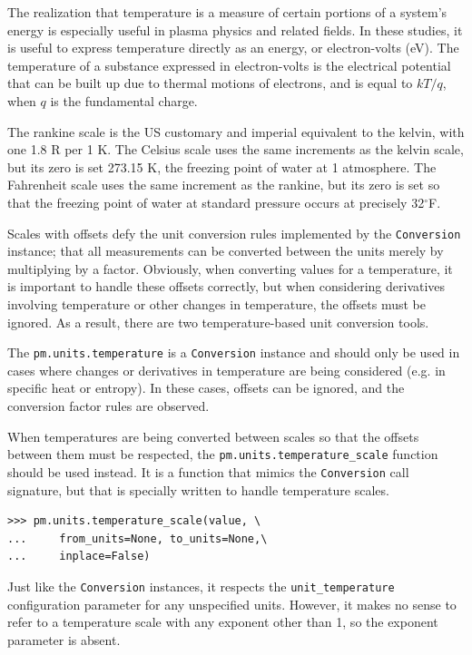 The realization that temperature is a measure of certain portions of a system's energy is especially useful in plasma physics and related fields.  In these studies, it is useful to express temperature directly as an energy, or electron-volts (eV).  The temperature of a substance expressed in electron-volts is the electrical potential that can be built up due to thermal motions of electrons, and is equal to $kT / q$, when $q$ is the fundamental charge.

The rankine scale is the US customary and imperial equivalent to the kelvin, with one 1.8 R per 1 K.  The Celsius scale uses the same increments as the kelvin scale, but its zero is set 273.15 K, the freezing point of water at 1 atmosphere.  The Fahrenheit scale uses the same increment as the rankine, but its zero is set so that the freezing point of water at standard pressure occurs at precisely 32$^\circ$F.

Scales with offsets defy the unit conversion rules implemented by the \verb|Conversion| instance; that all measurements can be converted between the units merely by multiplying by a factor.  Obviously, when converting values for a temperature, it is important to handle these offsets correctly, but when considering derivatives involving temperature or other changes in temperature, the offsets must be ignored.  As a result, there are two temperature-based unit conversion tools.

The \verb|pm.units.temperature| is a \verb|Conversion| instance and should only be used in cases where changes or derivatives in temperature are being considered (e.g. in specific heat or entropy).  In these cases, offsets can be ignored, and the conversion factor rules are observed.  

When temperatures are being converted between scales so that the offsets between them must be respected, the \verb|pm.units.temperature_scale| function should be used instead.  It is a function that mimics the \verb|Conversion| call signature, but that is specially written to handle temperature scales. 

\begin{lstlisting}
>>> pm.units.temperature_scale(value, \
...     from_units=None, to_units=None,\
...     inplace=False)
\end{lstlisting}

Just like the \verb|Conversion| instances, it respects the \verb|unit_temperature| configuration parameter for any unspecified units.  However, it makes no sense to refer to a temperature scale with any exponent other than 1, so the exponent parameter is absent.

